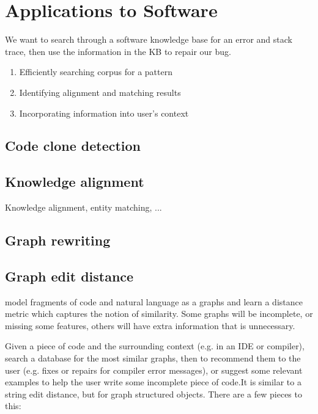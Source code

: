 \documentclass[11pt]{article}
\begin{document}
    \section{Applications to Software}

    We want to search through a software knowledge base for an error and stack trace, then use the information in the KB to repair our bug.

    \begin{enumerate}
        \item Efficiently searching corpus for a pattern
        \item Identifying alignment and matching results
        \item Incorporating information into user's context
    \end{enumerate}


    \subsection{Code clone detection}

    \subsection{Knowledge alignment}

    Knowledge alignment, entity matching, ...

    \subsection{Graph rewriting}

    \subsection{Graph edit distance}

    model fragments of code and natural language as a graphs and learn a distance metric which captures the notion of similarity. Some graphs will be incomplete, or missing some features, others will have extra information that is unnecessary.

    Given a piece of code and the surrounding context (e.g. in an IDE or compiler), search a database for the most similar graphs, then to recommend them to the user (e.g. fixes or repairs for compiler error messages), or suggest some relevant examples to help the user write some incomplete piece of code.It is similar to a string edit distance, but for graph structured objects. There are a few pieces to this:
\end{document}
